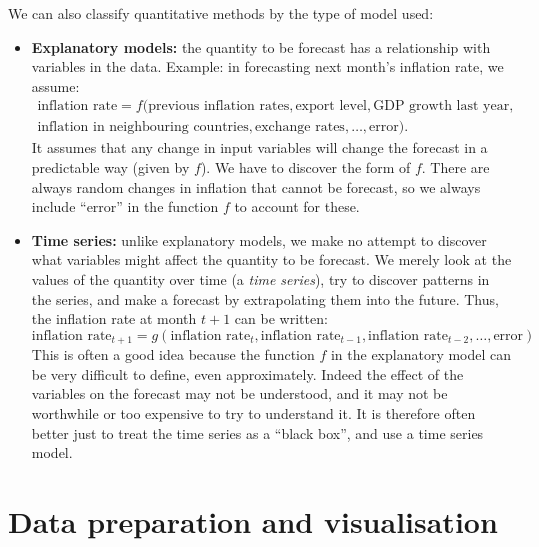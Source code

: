 \documentclass[a4paper,11pt,oneside,onecolumn]{book}
\begin{document}
We can also classify quantitative methods by the type of model used:
\begin{itemize}
\item \textbf{Explanatory models:} the quantity to be forecast has a
relationship with variables in the data. Example: in forecasting
next month's inflation rate, we assume: \begin{multline*}
\mbox{inflation rate} = f(\mbox{previous inflation
rates},\mbox{export level},\mbox{GDP growth last
year},\\
\mbox{inflation in neighbouring countries}, \mbox{exchange
rates},\ldots,\mbox{error}).
\end{multline*}
It assumes that any change in input variables will change the
forecast in a predictable way (given by $f$). We have to discover
the form of $f$. There are always random changes in inflation that
cannot be forecast, so we always include ``error'' in the function
$f$ to account for these.
\item \textbf{Time series:} unlike explanatory models, we make no attempt to discover what variables
might affect the quantity to be forecast. We merely look at the
values of the quantity over time (a {\it time series}), try to
discover patterns in the series, and make a forecast by
extrapolating them into the future. Thus, the inflation rate at
month $t+1$ can be written:
\[ \mbox{inflation rate}_{t+1} = g(\mbox{inflation
rate}_t,\mbox{inflation rate}_{t-1},\mbox{inflation
rate}_{t-2},\ldots,\mbox{error})
\]
This is often a good idea because the function $f$ in the
explanatory model can be very difficult to define, even
approximately. Indeed the effect of the variables on the forecast
may not be understood, and it may not be worthwhile or too expensive
to try to understand it. It is therefore often better just to treat
the time series as a ``black box'', and use a time series model.
\end{itemize}


\vspace{2cm}


\part{Data preparation and visualisation}
\end{document}
